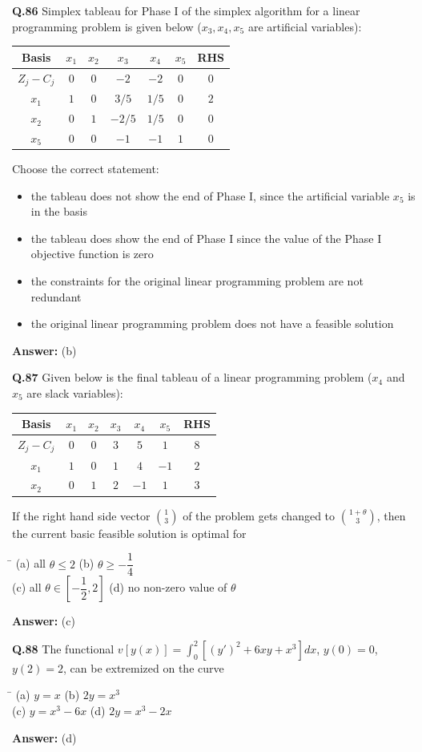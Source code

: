 \documentclass[11pt,a4paper]{article}
\newcommand{\optsfour}[4]{%
  \begin{tabbing}
    \hspace{0.48\linewidth}\=\kill
    (a) #1 \> (b) #2 \\[2pt]
    (c) #3 \> (d) #4
  \end{tabbing}%
}
\newcommand{\optslist}[4]{%
  \begin{itemize}
    \setlength{\itemsep}{2pt}\setlength{\parskip}{0pt}
    \item[(a)] #1
    \item[(b)] #2
    \item[(c)] #3
    \item[(d)] #4
  \end{itemize}%
}
\newcommand{\ans}[1]{\textbf{Answer:} #1\par\medskip}
\begin{document}
\textbf{Q.86} Simplex tableau for Phase I of the simplex algorithm for a linear programming problem is given below ($x_3, x_4, x_5$ are artificial variables):
\begin{center}
\begin{tabular}{ccccccc}
  \toprule
  Basis & $x_1$ & $x_2$ & $x_3$ & $x_4$ & $x_5$ & RHS \\
  \midrule
  $Z_j - C_j$ & $0$ & $0$ & $-2$ & $-2$ & $0$ & $0$ \\
  $x_1$ & $1$ & $0$ & $3/5$ & $1/5$ & $0$ & $2$ \\
  $x_2$ & $0$ & $1$ & $-2/5$ & $1/5$ & $0$ & $0$ \\
  $x_5$ & $0$ & $0$ & $-1$ & $-1$ & $1$ & $0$ \\
  \bottomrule
\end{tabular}
\end{center}
Choose the correct statement:
\optslist{the tableau does not show the end of Phase I, since the artificial variable $x_5$ is in the basis}{the tableau does show the end of Phase I since the value of the Phase I objective function is zero}{the constraints for the original linear programming problem are not redundant}{the original linear programming problem does not have a feasible solution}
\ans{(b)}

\textbf{Q.87} Given below is the final tableau of a linear programming problem ($x_4$ and $x_5$ are slack variables):
\begin{center}
\begin{tabular}{ccccccc}
  \toprule
  Basis & $x_1$ & $x_2$ & $x_3$ & $x_4$ & $x_5$ & RHS \\
  \midrule
  $Z_j - C_j$ & $0$ & $0$ & $3$ & $5$ & $1$ & $8$ \\
  $x_1$ & $1$ & $0$ & $1$ & $4$ & $-1$ & $2$ \\
  $x_2$ & $0$ & $1$ & $2$ & $-1$ & $1$ & $3$ \\
  \bottomrule
\end{tabular}
\end{center}
If the right hand side vector $\binom{1}{3}$ of the problem gets changed to $\binom{1 + \theta}{3}$, then the current basic feasible solution is optimal for
\optsfour{all $\theta \le 2$}{$\theta \ge -\dfrac{1}{4}$}{all $\theta \in \left[-\dfrac{1}{2}, 2\right]$}{no non-zero value of $\theta$}
\ans{(c)}

\textbf{Q.88} The functional $v[y(x)] = \displaystyle\int_0^2 \left[(y')^2 + 6xy + x^3\right]dx$, $y(0) = 0$, $y(2) = 2$, can be extremized on the curve
\optsfour{$y = x$}{$2y = x^3$}{$y = x^3 - 6x$}{$2y = x^3 - 2x$}
\ans{(d)}
\end{document}
